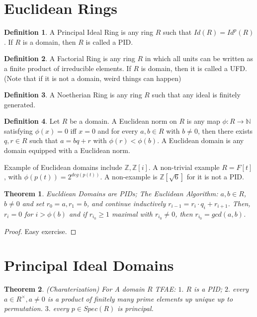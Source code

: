 \documentclass{article}
\newtheorem{theorem}{Theorem}[section]
\theoremstyle{definition}
\newtheorem{definition}{Definition}[section]
\theoremstyle{definition}
\begin{document}
\section{Euclidean Rings}
\begin{definition}
    A Principal Ideal Ring is any ring $R$ such that $Id(R)=Id^p(R)$. If $R$ is a domain, then $R$ is called a PID. 
\end{definition}
\begin{definition}
    A Factorial Ring is any ring $R$ in which all units can be written as a finite product of irreducible elements. If $R$ is domain, then it is called a UFD. (Note that if it is not a domain, weird things can happen)
\end{definition}
\begin{definition}
    A Noetherian Ring is any ring $R$ such that any ideal is finitely generated. 
\end{definition}



\begin{definition}
    Let $R$ be a domain. A Euclidean norm on $R$ is any map $\phi: R\to \mathbb N$ satisfying $\phi(x)=0 $ iff $x=0$ and for every $a,b\in R$ with $b\neq 0$, then there exists $q,r\in R$ such that $a=bq+r$ with $\phi(r)<\phi(b) $. A Euclidean domain is any domain equipped with a Euclidean norm.
\end{definition}
Example of Euclidean domains include $\mathbb Z,\mathbb Z[i]$. A non-trivial example $R=F[t]$, with $\phi(p(t))=2^{deg(p(t))}$. A non-example is $\mathbb Z[\sqrt{6}]$ for it is not a PID.

\begin{theorem}
    Eucldiean Domains are PIDs; The Euclidean Algorithm: $a,b\in R$, $b\neq 0$ and set $r_0=a,r_1=b$, and continue inductively $r_{i-1}=r_i\cdot q_i+r_{i+1}$. Then, $r_i=0$ for $i>\phi(b)$ and if $r_{i_0}\geq 1$ maximal with $r_{i_0}\neq 0$, then $r_{i_0}=gcd(a,b)$.
\end{theorem}
\begin{proof}
    Easy exercise.
\end{proof}

\section{Principal Ideal Domains}
\begin{theorem}
    (Charaterization) For A domain $R$ TFAE: $1.$ $R$ is a PID; $2.$ every $a\in R^{\times}, a\neq 0$ is a product of finitely many prime elements up unique up to permutation. $3.$ every $p\in Spec(R)$ is principal. 
\end{theorem}
\end{document}

